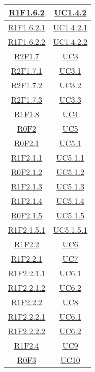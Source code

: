 \begin{longtable}{|c|c|}
\hline
\hyperlink{R1F1.6.2}{R1F1.6.2} & \hyperlink{UC1.4.2}{UC1.4.2}\\
\hline
\hyperlink{R1F1.6.2.1}{R1F1.6.2.1} & \hyperlink{UC1.4.2.1}{UC1.4.2.1}\\
\hline
\hyperlink{R1F1.6.2.2}{R1F1.6.2.2} & \hyperlink{UC1.4.2.2}{UC1.4.2.2}\\
\hline
\hyperlink{R2F1.7}{R2F1.7} & \hyperlink{UC3}{UC3}\\
\hline
\hyperlink{R2F1.7.1}{R2F1.7.1} & \hyperlink{UC3.1}{UC3.1}\\
\hline
\hyperlink{R2F1.7.2}{R2F1.7.2} & \hyperlink{UC3.2}{UC3.2}\\
\hline
\hyperlink{R2F1.7.3}{R2F1.7.3} & \hyperlink{UC3.3}{UC3.3}\\
\hline
\hyperlink{R1F1.8}{R1F1.8} & \hyperlink{UC4}{UC4}\\
\hline
\hyperlink{R0F2}{R0F2} & \hyperlink{UC5}{UC5}\\
\hline
\hyperlink{R0F2.1}{R0F2.1} & \hyperlink{UC5.1}{UC5.1}\\
\hline
\hyperlink{R1F2.1.1}{R1F2.1.1} & \hyperlink{UC5.1.1}{UC5.1.1}\\
\hline
\hyperlink{R0F2.1.2}{R0F2.1.2} & \hyperlink{UC5.1.2}{UC5.1.2}\\
\hline
\hyperlink{R1F2.1.3}{R1F2.1.3} & \hyperlink{UC5.1.3}{UC5.1.3}\\
\hline
\hyperlink{R1F2.1.4}{R1F2.1.4} & \hyperlink{UC5.1.4}{UC5.1.4}\\
\hline
\hyperlink{R0F2.1.5}{R0F2.1.5} & \hyperlink{UC5.1.5}{UC5.1.5}\\
\hline
\hyperlink{R1F2.1.5.1}{R1F2.1.5.1} & \hyperlink{UC5.1.5.1}{UC5.1.5.1}\\
\hline
\hyperlink{R1F2.2}{R1F2.2} & \hyperlink{UC6}{UC6}\\
\hline
\hyperlink{R1F2.2.1}{R1F2.2.1} & \hyperlink{UC7}{UC7}\\
\hline
\hyperlink{R1F2.2.1.1}{R1F2.2.1.1} & \hyperlink{UC6.1}{UC6.1}\\
\hline
\hyperlink{R1F2.2.1.2}{R1F2.2.1.2} & \hyperlink{UC6.2}{UC6.2}\\
\hline
\hyperlink{R1F2.2.2}{R1F2.2.2} & \hyperlink{UC8}{UC8}\\
\hline
\hyperlink{R1F2.2.2.1}{R1F2.2.2.1} & \hyperlink{UC6.1}{UC6.1}\\
\hline
\hyperlink{R1F2.2.2.2}{R1F2.2.2.2} & \hyperlink{UC6.2}{UC6.2}\\
\hline
\hyperlink{R1F2.4}{R1F2.4} & \hyperlink{UC9}{UC9}\\
\hline
\hyperlink{R0F3}{R0F3} & \hyperlink{UC10}{UC10}\\

\end{longtable}
